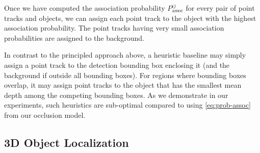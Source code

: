 Once we have computed the association probability $P^{ij}_{\text{assoc}}$ for every pair of point tracks and objects, we can assign each point track to the object with the highest association probability. The point tracks having very small association probabilities are assigned to the background.

In contrast to the principled approach above, a heuristic baseline may simply assign a point track to the detection bounding box enclosing it (and the background if outside all bounding boxes). For regions where bounding boxes overlap, it may assign point tracks to the object that has the smallest mean depth among the competing bounding boxes. As we demonstrate in our experiments, such heuristics are sub-optimal compared to using \eqref{eq:prob-assoc} from our occlusion model.




\subsection{3D Object Localization}
\label{sec:localization}



